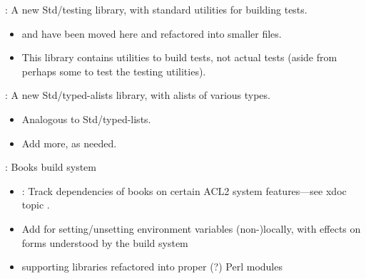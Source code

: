 
\begin{frame}

\newlibtitle

:
A new Std/testing library, with standard utilities for building tests.
\begin{itemize}
\item
{} and 
have been moved here and refactored into smaller files.
\item
This library contains utilities to build tests,
not actual tests (aside from perhaps some to test the testing utilities).
\end{itemize}

\separation

:
A new Std/typed-alists library, with alists of various types.
\begin{itemize}
\item
Analogous to Std/typed-lists.
\item
Add more, as needed.
\end{itemize}

\end{frame}


\begin{frame}

\implibtitle

:
Books build system
\begin{itemize}
\item {}: Track dependencies of books on certain ACL2 system features---see xdoc topic .
\item Add  for setting/unsetting environment
  variables (non-)locally, with effects on  forms
  understood by the build system
\item {} supporting libraries refactored into proper (?) Perl modules
\end{itemize}

\end{frame}


